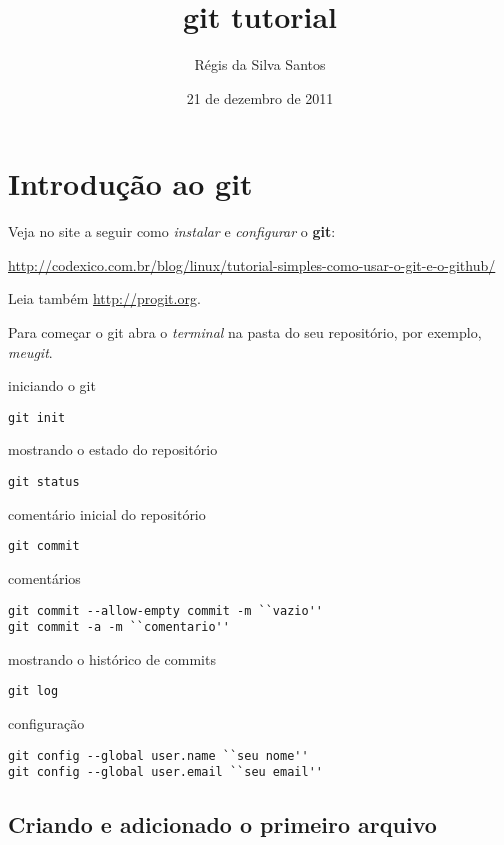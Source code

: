 \documentclass[a4paper]{article}
\title{git tutorial}
\author{R\'egis da Silva Santos}
\date{21 de dezembro de 2011}
\begin{document}
\maketitle

\section*{Introdução ao git}


\setlength\parindent{0pt}

Veja no site a seguir como \emph{instalar} e \emph{configurar} o \textbf{git}:

\url{http://codexico.com.br/blog/linux/tutorial-simples-como-usar-o-git-e-o-github/}

Leia também \url{http://progit.org}.

Para começar o git abra o \emph{terminal} na pasta do seu repositório, por exemplo, \emph{meugit}.

iniciando o git
\begin{lstlisting}
git init
\end{lstlisting}

mostrando o estado do repositório
\begin{lstlisting}
git status
\end{lstlisting}

comentário inicial do repositório
\begin{lstlisting}
git commit
\end{lstlisting}

comentários
\begin{lstlisting}
git commit --allow-empty commit -m ``vazio''
git commit -a -m ``comentario''
\end{lstlisting}

mostrando o histórico de commits
\begin{lstlisting}
git log
\end{lstlisting}

configuração
\begin{lstlisting}
git config --global user.name ``seu nome''
git config --global user.email ``seu email''
\end{lstlisting}

\subsection*{Criando e adicionado o primeiro arquivo}
\end{document}
